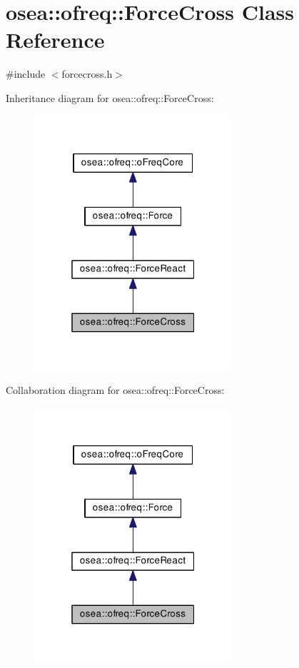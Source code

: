 \hypertarget{classosea_1_1ofreq_1_1_force_cross}{\section{osea\-:\-:ofreq\-:\-:Force\-Cross Class Reference}
\label{classosea_1_1ofreq_1_1_force_cross}
}


{\ttfamily \#include $<$forcecross.\-h$>$}



Inheritance diagram for osea\-:\-:ofreq\-:\-:Force\-Cross\-:\nopagebreak
\begin{figure}[H]
\begin{center}
\leavevmode
\includegraphics[width=208pt]{classosea_1_1ofreq_1_1_force_cross__inherit__graph}
\end{center}
\end{figure}


Collaboration diagram for osea\-:\-:ofreq\-:\-:Force\-Cross\-:\nopagebreak
\begin{figure}[H]
\begin{center}
\leavevmode
\includegraphics[width=208pt]{classosea_1_1ofreq_1_1_force_cross__coll__graph}
\end{center}
\end{figure}
